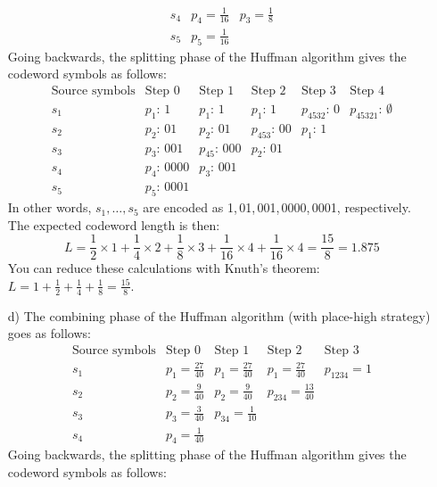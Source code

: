 \documentclass[11pt]{article}
\begin{document}
\begin{itemize}
\[\begin{array}{clllll}
         s_4          & p_4 = \frac{1}{16} & p_3    = \frac{1}{8}\\[1mm]
         s_5          & p_5 = \frac{1}{16}
     \end{array}\]
     Going backwards, the splitting phase of the Huffman algorithm gives the codeword symbols as follows:
     \[\begin{array}{clllll}
 \text{Source symbols}& \text{Step 0} & \text{Step 1} & \text{Step 2} & \text{Step 3}  & \text{Step 4}\\[1mm]
         s_1          & p_1:\,     1  & p_1:\,      1 & p_1:\,     1  & p_{4532}:\,0   & p_{45321}:\,\emptyset\\[1mm]
         s_2          & p_2:\,    01  & p_2:\,     01 & p_{453}:\,00  & p_1:     \,1\\[1mm]
         s_3          & p_3:\,   001  & p_{45}:\, 000 & p_2:\,    01\\[1mm]
         s_4          & p_4:\,  0000  & p_3:\,    001\\[1mm]
         s_5          & p_5:\,  0001
     \end{array}\]
     In other words, $s_1,\ldots,s_5$ are encoded as 1,\,01,\,001,\,0000,\,0001, respectively.\\
     The expected codeword length is then:
     \[
       L = \frac{1}{2}\times 1 + \frac{1}{4}\times 2 + \frac{1}{8}\times 3 + \frac{1}{16}\times 4 + \frac{1}{16}\times 4
         = \frac{15}{8}
         = 1.875
     \]
     You can reduce these calculations with Knuth's theorem: $L = 1 + \frac{1}{2} + \frac{1}{4} + \frac{1}{8} = \frac{15}{8}$.
  \item[{d)}] The combining phase of the Huffman algorithm (with place-high strategy) goes as follows:
     \[\begin{array}{clllll}
 \text{Source symbols}& \text{Step 0}       & \text{Step 1}          & \text{Step 2}           & \text{Step 3}\\[1mm]
         s_1          & p_1 = \frac{27}{40} & p_1    = \frac{27}{40} & p_1     = \frac{27}{40} & p_{1234} = 1\\[1mm]
         s_2          & p_2 = \frac{ 9}{40} & p_2    = \frac{ 9}{40} & p_{234} = \frac{13}{40}\\[1mm]
         s_3          & p_3 = \frac{ 3}{40} & p_{34} = \frac{ 1}{10}\\[1mm]
         s_4          & p_4 = \frac{ 1}{40}
     \end{array}\]
     Going backwards, the splitting phase of the Huffman algorithm gives the codeword symbols as follows:

\end{itemize}
\end{document}
